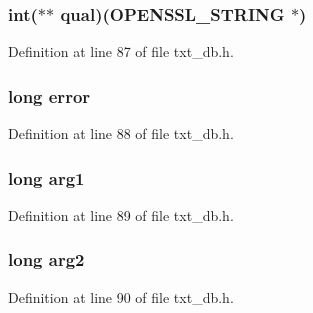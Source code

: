 \subsubsection[{\texorpdfstring{qual}{qual}}]{\setlength{\rightskip}{0pt plus 5cm}int($\ast$$\ast$ qual)({\bf O\+P\+E\+N\+S\+S\+L\+\_\+\+S\+T\+R\+I\+NG} $\ast$)}\hypertarget{structtxt__db__st_ade931ec8bf7b514a879a8c90db043e81}{}\label{structtxt__db__st_ade931ec8bf7b514a879a8c90db043e81}


Definition at line 87 of file txt\+\_\+db.\+h.

\subsubsection[{\texorpdfstring{error}{error}}]{\setlength{\rightskip}{0pt plus 5cm}long error}\hypertarget{structtxt__db__st_a0034dae14c0236405964d5d0ca247c6b}{}\label{structtxt__db__st_a0034dae14c0236405964d5d0ca247c6b}


Definition at line 88 of file txt\+\_\+db.\+h.

\subsubsection[{\texorpdfstring{arg1}{arg1}}]{\setlength{\rightskip}{0pt plus 5cm}long arg1}\hypertarget{structtxt__db__st_a83b4aa0ac2049142d89199a5bb676b5e}{}\label{structtxt__db__st_a83b4aa0ac2049142d89199a5bb676b5e}


Definition at line 89 of file txt\+\_\+db.\+h.

\subsubsection[{\texorpdfstring{arg2}{arg2}}]{\setlength{\rightskip}{0pt plus 5cm}long arg2}\hypertarget{structtxt__db__st_a84553ad5f6fe0e4c3294893a27162ea3}{}\label{structtxt__db__st_a84553ad5f6fe0e4c3294893a27162ea3}


Definition at line 90 of file txt\+\_\+db.\+h.

